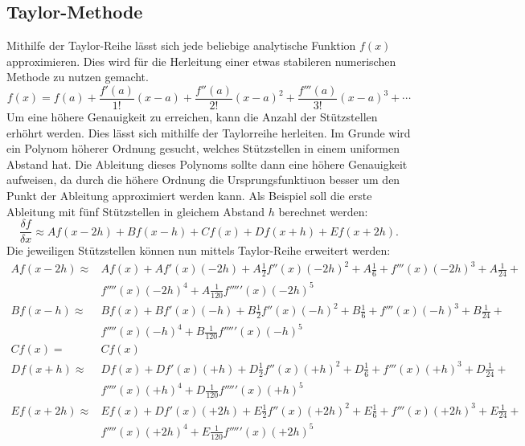 \subsection{Taylor-Methode}
Mithilfe der Taylor-Reihe lässt sich jede beliebige analytische Funktion $f(x)$ approximieren. Dies wird für die Herleitung einer etwas stabileren numerischen Methode zu nutzen gemacht.
\begin{equation}
f(x) = f(a)+{\frac {f'(a)}{1!}}(x-a)+{\frac {f''(a)}{2!}}(x-a)^{2}+{\frac {f'''(a)}{3!}}(x-a)^{3}+\cdots
\label{ableitung:eqn:taylorseries}
\end{equation}
Um eine höhere Genauigkeit zu erreichen, kann die Anzahl der Stützstellen erhöhrt werden. 
Dies lässt sich mithilfe der Taylorreihe herleiten.
Im Grunde wird ein Polynom höherer Ordnung gesucht, welches Stützstellen in einem uniformen Abstand hat.
Die Ableitung dieses Polynoms sollte dann eine höhere Genauigkeit aufweisen, da durch die höhere Ordnung die Ursprungsfunktiuon besser um den Punkt der Ableitung approximiert werden kann.
Als Beispiel soll die erste Ableitung mit fünf Stützstellen in gleichem Abstand $h$ berechnet werden:
\begin{equation}
\frac{\delta f}{\delta x} \approx Af(x-2h) + Bf(x-h) + Cf(x) + Df(x+h) + Ef(x+2h) \text{.}
\end{equation}
Die jeweiligen Stützstellen können nun mittels Taylor-Reihe erweitert werden:
\begin{equation}
\begin{split}
Af(x-2h) \approx & Af(x) + Af'(x)(-2h) + A\frac{1}{2}f''(x)(-2h)^2+A\frac{1}{6} + f'''(x)(-2h)^3+A\frac{1}{24} + \\ 
& f''''(x)(-2h)^4 + A\frac{1}{120}f'''''(x)(-2h)^5 \\
Bf(x-h) \approx & Bf(x) + Bf'(x)(-h) + B\frac{1}{2}f''(x)(-h)^2+B\frac{1}{6} + f'''(x)(-h)^3+B\frac{1}{24} + \\ 
& f''''(x)(-h)^4 + B\frac{1}{120}f'''''(x)(-h)^5 \\
Cf(x) = & Cf(x) \\
Df(x+h) \approx & Df(x) + Df'(x)(+h) + D\frac{1}{2}f''(x)(+h)^2+D\frac{1}{6} + f'''(x)(+h)^3+D\frac{1}{24} + \\ 
& f''''(x)(+h)^4 + D\frac{1}{120}f'''''(x)(+h)^5 \\
Ef(x+2h) \approx & Ef(x) + Df'(x)(+2h) + E\frac{1}{2}f''(x)(+2h)^2+E\frac{1}{6} + f'''(x)(+2h)^3+E\frac{1}{24} + \\ 
& f''''(x)(+2h)^4 + E\frac{1}{120}f'''''(x)(+2h)^5
\end{split}
\end{equation}
